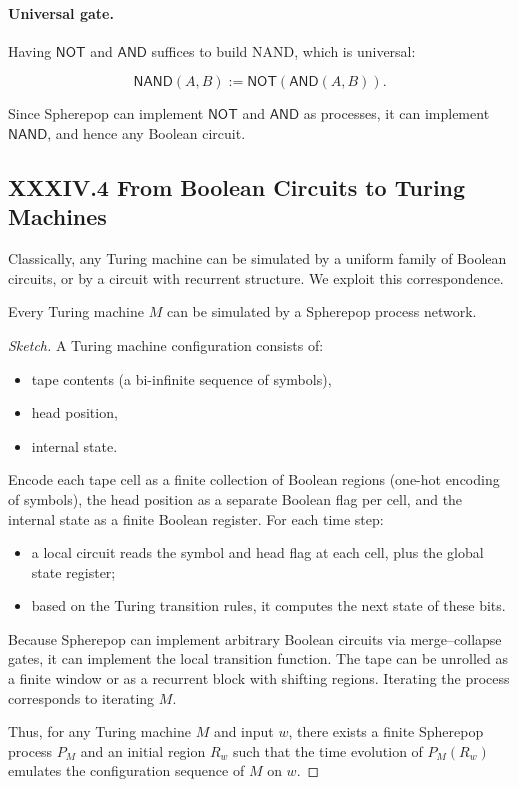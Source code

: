 \documentclass[12pt,letterpaper]{article}
\begin{document}
\paragraph{Universal gate.}
Having $\mathsf{NOT}$ and $\mathsf{AND}$ suffices to build NAND, which is universal:

\[
\mathsf{NAND}(A,B) := \mathsf{NOT}(\mathsf{AND}(A,B)).
\]

Since Spherepop can implement $\mathsf{NOT}$ and $\mathsf{AND}$ as processes, it can implement $\mathsf{NAND}$, and hence any Boolean circuit.

\subsection{XXXIV.4 From Boolean Circuits to Turing Machines}

Classically, any Turing machine can be simulated by a uniform family of Boolean circuits, or by a circuit with recurrent structure. We exploit this correspondence.

\begin{theorem}
Every Turing machine $M$ can be simulated by a Spherepop process network.
\end{theorem}

\begin{proof}[Sketch]
A Turing machine configuration consists of:

\begin{itemize}
  \item tape contents (a bi-infinite sequence of symbols),
  \item head position,
  \item internal state.
\end{itemize}

Encode each tape cell as a finite collection of Boolean regions (one-hot encoding of symbols), the head position as a separate Boolean flag per cell, and the internal state as a finite Boolean register. For each time step:

\begin{itemize}
  \item a local circuit reads the symbol and head flag at each cell, plus the global state register;
  \item based on the Turing transition rules, it computes the next state of these bits.
\end{itemize}

Because Spherepop can implement arbitrary Boolean circuits via merge--collapse gates, it can implement the local transition function. The tape can be unrolled as a finite window or as a recurrent block with shifting regions. Iterating the process corresponds to iterating $M$.

Thus, for any Turing machine $M$ and input $w$, there exists a finite Spherepop process $P_M$ and an initial region $R_w$ such that the time evolution of $P_M(R_w)$ emulates the configuration sequence of $M$ on $w$.
\end{proof}
\end{document}
